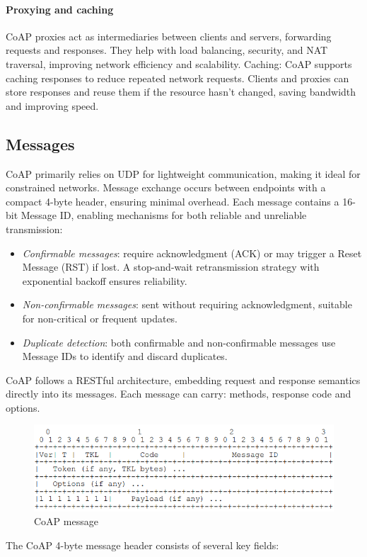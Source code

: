 \paragraph*{Proxying and caching}
CoAP proxies act as intermediaries between clients and servers, forwarding requests and responses. 
They help with load balancing, security, and NAT traversal, improving network efficiency and scalability.
Caching: CoAP supports caching responses to reduce repeated network requests. 
Clients and proxies can store responses and reuse them if the resource hasn't changed, saving bandwidth and improving speed.

\subsection{Messages}
CoAP primarily relies on UDP for lightweight communication, making it ideal for constrained networks. 
Message exchange occurs between endpoints with a compact 4-byte header, ensuring minimal overhead.
Each message contains a 16-bit Message ID, enabling mechanisms for both reliable and unreliable transmission:
\begin{itemize}
    \item \textit{Confirmable messages}: require acknowledgment (ACK) or may trigger a Reset Message (RST) if lost. 
        A stop-and-wait retransmission strategy with exponential backoff ensures reliability.
    \item \textit{Non-confirmable messages}: sent without requiring acknowledgment, suitable for non-critical or frequent updates.
    \item \textit{Duplicate detection}: both confirmable and non-confirmable messages use Message IDs to identify and discard duplicates.
\end{itemize}
CoAP follows a RESTful architecture, embedding request and response semantics directly into its messages. 
Each message can carry: methods, response code and options. 
\begin{figure}[H]
    \centering
    \includegraphics[width=0.5\linewidth]{images/coap1.png}
    \caption{CoAP message}
\end{figure}
The CoAP 4-byte message header consists of several key fields:
